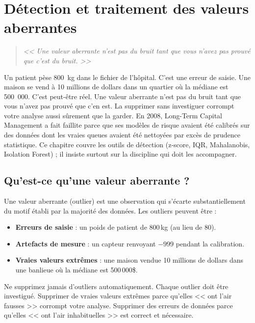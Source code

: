 \chapter{D\'etection et traitement des valeurs aberrantes}
\label{ch:outliers}

\begin{quote}
\emph{<< Une valeur aberrante n'est pas du bruit tant que vous n'avez pas prouv\'e que c'est du bruit. >>}
\end{quote}

Un patient pèse 800~kg dans le fichier de l'hôpital. C'est une erreur de saisie. Une maison se vend à 10 millions de dollars dans un quartier où la médiane est 500~000. C'est peut-être réel. Une valeur aberrante n'est pas du bruit tant que vous n'avez pas prouvé que c'en est. La supprimer sans investiguer corrompt votre analyse aussi sûrement que la garder. En 2008, Long-Term Capital Management a fait faillite parce que ses modèles de risque avaient été calibrés sur des données dont les vraies queues avaient été nettoyées par excès de prudence statistique. Ce chapitre couvre les outils de détection (z-score, IQR, Mahalanobis, Isolation Forest) ; il insiste surtout sur la discipline qui doit les accompagner.
\section{Qu'est-ce qu'une valeur aberrante ?}

Une valeur aberrante (outlier) est une observation qui s'\'ecarte substantiellement du motif \'etabli par la majorit\'e des donn\'ees. Les outliers peuvent \^etre :

\begin{itemize}
  \item \textbf{Erreurs de saisie} : un poids de patient de 800\,kg (au lieu de 80).
  \item \textbf{Artefacts de mesure} : un capteur renvoyant $-999$ pendant la calibration.
  \item \textbf{Vraies valeurs extr\^emes} : une maison vendue 10 millions de dollars dans une banlieue o\`u la m\'ediane est 500\,000\$.
\end{itemize}

\begin{warningbox}
Ne supprimez jamais d'outliers automatiquement. Chaque outlier doit \^etre investigu\'e. Supprimer de vraies valeurs extr\^emes parce qu'elles << ont l'air fausses >> corrompt votre analyse. Supprimer des erreurs de donn\'ees parce qu'elles << ont l'air inhabituelles >> est correct et n\'ecessaire.
\end{warningbox}

